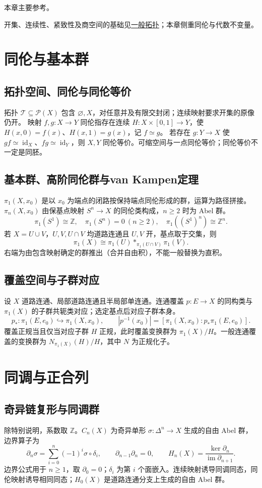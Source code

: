 \documentclass[../main.tex]{subfiles}
\begin{document}
本章主要参考\cite{hatcher}。

开集、连续性、紧致性及商空间的基础见\hyperref[chap:general-topology]{一般拓扑}；本章侧重同伦与代数不变量。
\section{同伦与基本群}
\subsection{拓扑空间、同伦与同伦等价}
拓扑 $\mathcal T\subseteq\mathcal P(X)$ 包含 $\varnothing,X$，对任意并及有限交封闭；连续映射要求开集的原像仍开。
映射 $f,g:X\to Y$ 同伦指存在连续 $H:X\times[0,1]\to Y$，使 $H(x,0)=f(x)$、$H(x,1)=g(x)$，记 $f\simeq g$。
若存在 $g:Y\to X$ 使 $gf\simeq\operatorname{id}_X$、$fg\simeq\operatorname{id}_Y$，则 $X,Y$ 同伦等价。可缩空间与一点同伦等价；同伦等价不一定是同胚。
\subsection{基本群、高阶同伦群与van Kampen定理}
$\pi_1(X,x_0)$ 是以 $x_0$ 为端点的闭路按保持端点同伦形成的群，运算为路径拼接。$\pi_n(X,x_0)$ 由保基点映射 $S^n\to X$ 的同伦类构成，$n\ge2$ 时为 Abel 群。
\[
\pi_1(S^1)\cong\mathbb Z,\quad\pi_1(S^n)=0\ (n\ge2),\quad
\pi_1((S^1)^n)\cong\mathbb Z^n.
\]
若 $X=U\cup V$，$U,V,U\cap V$ 均道路连通且 $U,V$ 开，基点取于交集，则
\[
\pi_1(X)\cong\pi_1(U)*_{\pi_1(U\cap V)}\pi_1(V).
\]
右端为由包含映射确定的群推出（合并自由积），不能一般替换为直积。
\subsection{覆盖空间与子群对应}
设 $X$ 道路连通、局部道路连通且半局部单连通。连通覆盖 $p:E\to X$ 的同构类与 $\pi_1(X)$ 的子群共轭类对应；选定基点后对应子群本身。
\[
p_*:\pi_1(E,e_0)\hookrightarrow\pi_1(X,x_0),\qquad
|p^{-1}(x_0)|=[\pi_1(X,x_0):p_*\pi_1(E,e_0)].
\]
覆盖正规当且仅当对应子群 $H$ 正规，此时覆盖变换群为 $\pi_1(X)/H$。一般连通覆盖的变换群为 $N_{\pi_1(X)}(H)/H$，其中 $N$ 为正规化子。
\section{同调与正合列}
\subsection{奇异链复形与同调群}
除特别说明，系数取 $\mathbb Z$。$C_n(X)$ 为奇异单形 $\sigma:\Delta^n\to X$ 生成的自由 Abel 群，边界算子为
\[
\partial_n\sigma=\sum_{i=0}^n(-1)^i\sigma\circ\delta_i,
\qquad\partial_{n-1}\partial_n=0,\qquad
H_n(X)=\frac{\ker\partial_n}{\operatorname{im}\partial_{n+1}}.
\]
边界公式用于 $n\ge1$，取 $\partial_0=0$；$\delta_i$ 为第 $i$ 个面嵌入。连续映射诱导同调同态，同伦映射诱导相同同态；$H_0(X)$ 是道路连通分支上生成的自由 Abel 群。
\end{document}
